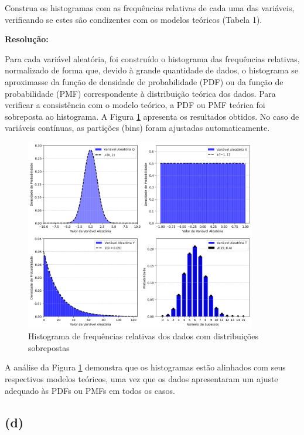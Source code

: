 \documentclass[a4paper, 11pt]{article}
\begin{document}
\noindent Construa os histogramas com as frequências relativas de cada uma das variáveis,
verificando se estes são condizentes com os modelos teóricos (Tabela 1).

\textbf{Resolução:}

Para cada variável aleatória, foi construído o histograma das frequências relativas, normalizado de forma que, devido à grande quantidade de dados, o histograma se aproximasse da função de densidade de probabilidade (PDF) ou da função de probabilidade (PMF) correspondente à distribuição teórica dos dados. Para verificar a consistência com o modelo teórico, a PDF ou PMF teórica foi sobreposta ao histograma. A Figura \ref{fig:hist} apresenta os resultados obtidos. No caso de variáveis contínuas, as partições (bins) foram ajustadas automaticamente.

\begin{figure}[H]
    \centering 
    \includegraphics[width=0.9\textwidth]{imgs/hist.png}
    \caption{Histograma de frequências relativas dos dados com distribuições sobrepostas}
    \label{fig:hist} %
\end{figure}

A análise da Figura \ref{fig:hist} demonstra que os histogramas estão alinhados com seus respectivos modelos teóricos, uma vez que os dados apresentaram um ajuste adequado às PDFs ou PMFs em todos os casos.

\subsection{\textbf{(d)}}
\end{document}
